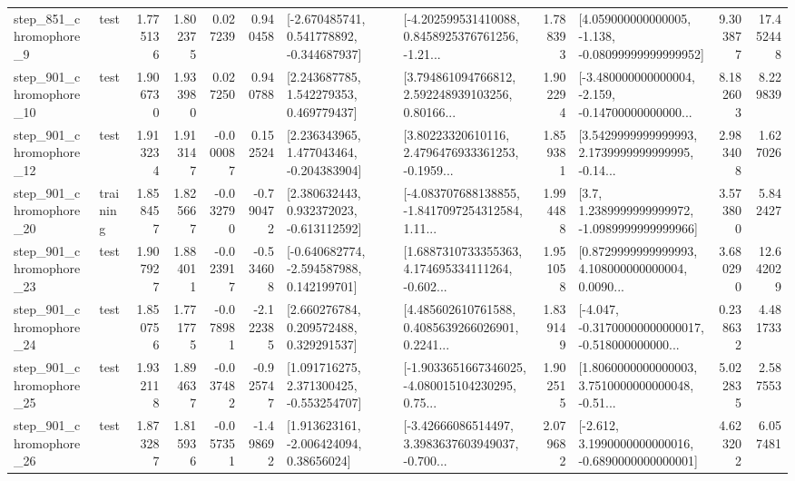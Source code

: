 \begin{tabular}{llrrrrllrlrr}
   step\_851\_chromophore\_9 &      test &      1.775136 &    1.802375 &      0.027239 &  0.940458 &   [-2.670485741, 0.541778892, -0.344687937] &  [-4.202599531410088, 0.8458925376761256, -1.21... &       1.788393 &  [4.059000000000005, -1.138, -0.08099999999999952] &            9.303877 &         17.452448 \\
  step\_901\_chromophore\_10 &      test &      1.906730 &    1.933980 &      0.027250 &  0.940788 &     [2.243687785, 1.542279353, 0.469779437] &  [3.794861094766812, 2.592248939103256, 0.80166... &       1.902294 &  [-3.480000000000004, -2.159, -0.14700000000000... &            8.182603 &          8.229839 \\
  step\_901\_chromophore\_12 &      test &      1.913234 &    1.913147 &     -0.000087 &  0.152524 &    [2.236343965, 1.477043464, -0.204383904] &  [3.80223320610116, 2.4796476933361253, -0.1959... &       1.859381 &  [3.5429999999999993, 2.1739999999999995, -0.14... &            2.983408 &          1.627026 \\
  step\_901\_chromophore\_20 &  training &      1.858457 &    1.825667 &     -0.032790 & -0.790472 &    [2.380632443, 0.932372023, -0.613112592] &  [-4.083707688138855, -1.8417097254312584, 1.11... &       1.994488 &     [3.7, 1.2389999999999972, -1.0989999999999966] &            3.573800 &          5.842427 \\
  step\_901\_chromophore\_23 &      test &      1.907927 &    1.884011 &     -0.023917 & -0.534608 &   [-0.640682774, -2.594587988, 0.142199701] &  [1.6887310733355363, 4.174695334111264, -0.602... &       1.951058 &  [0.8729999999999993, 4.108000000000004, 0.0090... &            3.680290 &         12.642029 \\
  step\_901\_chromophore\_24 &      test &      1.850756 &    1.771775 &     -0.078981 & -2.122385 &     [2.660276784, 0.209572488, 0.329291537] &  [4.485602610761588, 0.4085639266026901, 0.2241... &       1.839149 &  [-4.047, -0.31700000000000017, -0.518000000000... &            0.238632 &          4.481733 \\
  step\_901\_chromophore\_25 &      test &      1.932118 &    1.894637 &     -0.037482 & -0.925747 &    [1.091716275, 2.371300425, -0.553254707] &  [-1.9033651667346025, -4.080015104230295, 0.75... &       1.902515 &  [1.8060000000000003, 3.7510000000000048, -0.51... &            5.022835 &          2.587553 \\
  step\_901\_chromophore\_26 &      test &      1.873287 &    1.815936 &     -0.057351 & -1.498692 &     [1.913623161, -2.006424094, 0.38656024] &  [-3.42666086514497, 3.3983637603949037, -0.700... &       2.079682 &  [-2.612, 3.1990000000000016, -0.6890000000000001] &            4.623202 &          6.057481 \\

\end{tabular}
